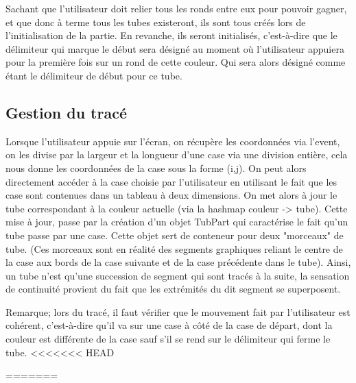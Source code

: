\documentclass[12pt, a4paper]{article}%
\begin{document}
    Sachant que l'utilisateur doit relier tous les ronds entre eux pour pouvoir gagner, et que donc à terme tous les tubes
    existeront, ils sont tous créés lors de l'initialisation de la partie. En revanche, ils seront initialisés, c'est-à-dire que
    le délimiteur qui marque le début sera désigné au moment où l'utilisateur appuiera pour la première fois sur un rond de cette
    couleur. Qui sera alors désigné comme étant le délimiteur de début pour ce tube.
    \subsection{Gestion du tracé}
    Lorsque l'utilisateur appuie sur l'écran, on récupère les coordonnées via l'event, on les divise par la largeur et la longueur
    d'une case via une division entière, cela nous donne les coordonnées de la case sous la forme (i,j). On peut alors directement
    accéder à la case choisie par l'utilisateur en utilisant le fait que les case sont contenues dans un tableau à deux
    dimensions. On met alors à jour le tube correspondant à la couleur actuelle (via la hashmap couleur -> tube). Cette mise à
    jour, passe par la création d'un objet TubPart qui caractérise le fait qu'un tube passe par une case. Cette objet sert de
    conteneur pour deux "morceaux" de tube. (Ces morceaux sont en réalité des segments graphiques reliant le centre de la case aux
    bords de la case suivante et de la case précédente dans le tube). Ainsi, un tube n'est qu'une succession de segment qui sont
    tracés à la suite, la sensation de continuité provient du fait que les extrémités du dit segment se superposent.
    \newline

    Remarque; lors du tracé, il faut vérifier que le mouvement fait par l'utilisateur est cohérent, c'est-à-dire qu'il va sur une
    case à côté de la case de départ, dont la couleur est différente de la case sauf s'il se rend sur le délimiteur qui ferme le
    tube.
<<<<<<< HEAD
    
=======
\end{document}
